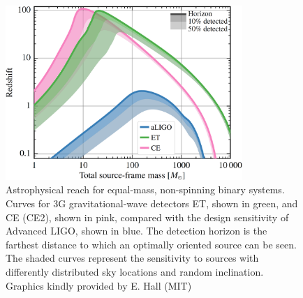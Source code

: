 \documentclass[graybox, nosecnum]{svmult}
\begin{document}

\begin{figure}[htbp]
\includegraphics[width=0.8\textwidth]{Figures/InspiralRange.png}
\caption{Astrophysical reach for equal-mass, non-spinning binary systems. 
Curves for 3G gravitational-wave detectors ET, shown in green, and CE (CE2), shown in pink, compared with the design sensitivity of Advanced LIGO, shown in blue. 
The detection horizon is the farthest distance to which an optimally oriented source can be seen. The shaded curves represent the sensitivity to sources with differently distributed sky locations and random inclination.
\hspace{\textwidth}
Graphics kindly provided by E. Hall (MIT)}
\label{fig:3Grange}
\end{figure}
\end{document}
